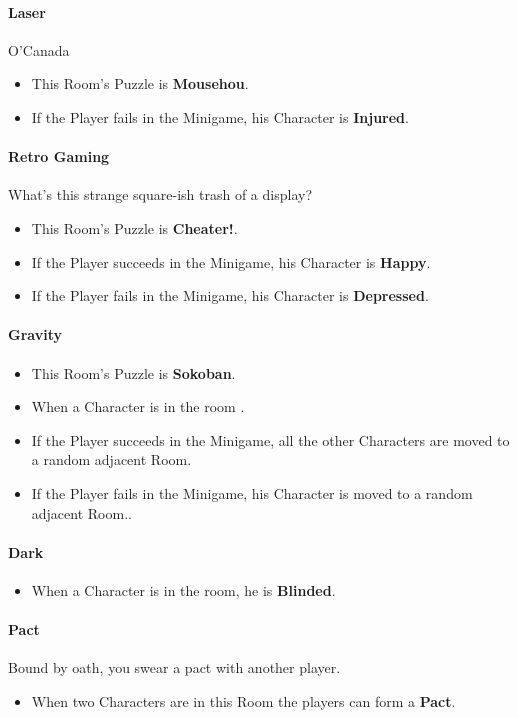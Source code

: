 \paragraph{Laser} O'Canada
\begin{itemize}
	\item This Room's Puzzle is \textbf{Mousehou}.
	\item If the Player fails    in the Minigame, his Character is \textbf{Injured}.
\end{itemize}

\paragraph{Retro Gaming} What's this strange square-ish trash of a display?
\begin{itemize}
	\item This Room's Puzzle is \textbf{Cheater!}.
	\item If the Player succeeds in the Minigame, his Character is \textbf{Happy}.
	\item If the Player fails    in the Minigame, his Character is \textbf{Depressed}.
\end{itemize}

\paragraph{Gravity} 
\begin{itemize}
	\item This Room's Puzzle is \textbf{Sokoban}.
	\item When a Character is in the room .
	\item If the Player succeeds in the Minigame, all the other Characters are moved to a random adjacent Room.
	\item If the Player fails    in the Minigame, his Character is moved to a random adjacent Room..
\end{itemize}

\paragraph{Dark} 
\begin{itemize}
	\item When a Character is in the room, he is \textbf{Blinded}.
\end{itemize}

\paragraph{Pact} Bound by oath, you swear a pact with another player. 
\begin{itemize}
	\item When two Characters are in this Room the players can form a \textbf{Pact}.
\end{itemize}

